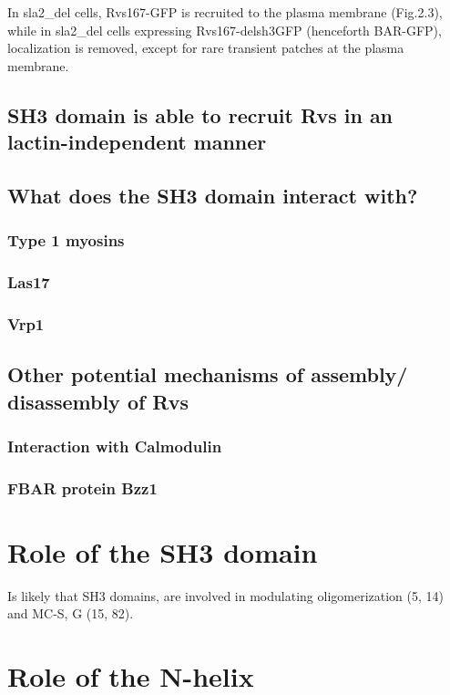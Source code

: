 	\vspace{5mm}
	In sla2_del cells, Rvs167-GFP is recruited to the plasma membrane (Fig.2.3), while in sla2_del cells expressing Rvs167-delsh3GFP (henceforth BAR-GFP), localization is removed, except for rare transient patches at the plasma membrane. 

	
	\subsection{SH3 domain is able to recruit Rvs in an 	\\
		lactin-independent manner}
	\subsection{What does the SH3 domain interact with?}
		\subsubsection{Type 1 myosins}
		\subsubsection{Las17}
		\subsubsection{Vrp1}

	\subsection{Other potential mechanisms of assembly/ disassembly of Rvs}		
			\subsubsection{Interaction with Calmodulin}
			\subsubsection{FBAR protein Bzz1}
				
\section{Role of the SH3 domain}	
Is likely that SH3 domains, are involved in modulating oligomerization (5, 14) and MC-S, G (15, 82). 	
\section{Role of the N-helix}			
		
